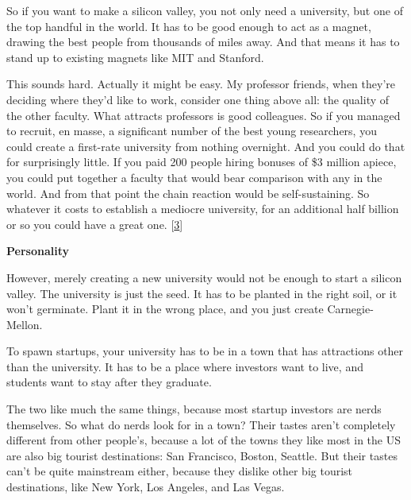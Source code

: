 So
                  if you want to make a silicon valley, you not only need a
                  university, but one of the top handful in the world. It has to
                  be good enough to act as a magnet, drawing the best people
                  from thousands of miles away. And that means it has to stand
                  up to existing magnets like MIT and Stanford.

This
                  sounds hard. Actually it might be easy. My professor friends,
                  when they're deciding where they'd like to work, consider one
                  thing above all: the quality of the other faculty. What
                  attracts professors is good colleagues. So if you managed to
                  recruit, en masse, a significant number of the best young
                  researchers, you could create a first-rate university from
                  nothing overnight. And you could do that for surprisingly
                  little. If you paid 200 people hiring bonuses of \$3 million
                  apiece, you could put together a faculty that would bear
                  comparison with any in the world. And from that point the
                  chain reaction would be self-sustaining. So whatever it costs
                  to establish a mediocre university, for an additional half
                  billion or so you could have a great one.
                  [\href{\#f3n}{3}]

\textbf{Personality}

However, merely
                  creating a new university would not be enough to start a
                  silicon valley. The university is just the seed. It has to be
                  planted in the right soil, or it won't germinate. Plant it in
                  the wrong place, and you just create Carnegie-Mellon.

To
                  spawn startups, your university has to be in a town that has
                  attractions other than the university. It has to be a place
                  where investors want to live, and students want to stay after
                  they graduate.

The two like much the same things,
                  because most startup investors are nerds themselves. So what
                  do nerds look for in a town? Their tastes aren't completely
                  different from other people's, because a lot of the towns they
                  like most in the US are also big tourist destinations: San
                  Francisco, Boston, Seattle. But their tastes can't be quite
                  mainstream either, because they dislike other big tourist
                  destinations, like New York, Los Angeles, and Las Vegas.

